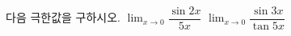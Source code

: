다음 극한값을 구하시오.
 $\displaystyle\lim_{x\to 0}\dfrac{\sin 2x}{5x}$
 $\displaystyle\lim_{x\to 0}\dfrac{\sin 3x}{\tan 5x}$
